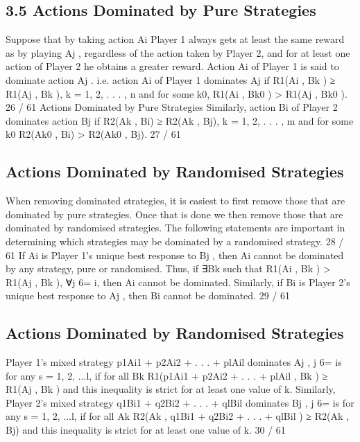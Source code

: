 \documentclass[]{report}
\begin{document}
\subsection{3.5 Actions Dominated by Pure Strategies}
Suppose that by taking action Ai Player 1 always gets at least the
same reward as by playing Aj
, regardless of the action taken by
Player 2, and for at least one action of Player 2 he obtains a
greater reward. Action Ai of Player 1 is said to dominate action Aj
.
i.e. action Ai of Player 1 dominates Aj
if
R1(Ai
, Bk ) ≥ R1(Aj
, Bk ), k = 1, 2, . . . , n
and for some k0, R1(Ai
, Bk0
) > R1(Aj
, Bk0
).
26 / 61
Actions Dominated by Pure Strategies
Similarly, action Bi of Player 2 dominates action Bj
if
R2(Ak , Bi) ≥ R2(Ak , Bj), k = 1, 2, . . . , m
and for some k0
R2(Ak0
, Bi) > R2(Ak0
, Bj).
27 / 61
\subsection{Actions Dominated by Randomised Strategies}
When removing dominated strategies, it is easiest to first remove
those that are dominated by pure strategies.
Once that is done we then remove those that are dominated by
randomised strategies.
The following statements are important in determining which
strategies may be dominated by a randomised strategy.
28 / 61
If Ai
is Player 1’s unique best response to Bj
, then Ai cannot be
dominated by any strategy, pure or randomised.
Thus, if ∃Bk such that R1(Ai
, Bk ) > R1(Aj
, Bk ), ∀j 6= i, then Ai
cannot be dominated.
Similarly, if Bi
is Player 2’s unique best response to Aj
, then Bi
cannot be dominated.
29 / 61
\subsection{Actions Dominated by Randomised Strategies}
Player 1’s mixed strategy p1Ai1 + p2Ai2 + . . . + plAil
dominates Aj
,
j 6= is for any s = 1, 2, ...l, if for all Bk
R1(p1Ai1 + p2Ai2 + . . . + plAil
, Bk ) ≥ R1(Aj
, Bk )
and this inequality is strict for at least one value of k.
Similarly, Player 2’s mixed strategy q1Bi1 + q2Bi2 + . . . + qlBil
dominates Bj
, j 6= is for any s = 1, 2, ...l, if for all Ak
R2(Ak , q1Bi1 + q2Bi2 + . . . + qlBil
) ≥ R2(Ak , Bj)
and this inequality is strict for at least one value of k.
30 / 61
\end{document}
